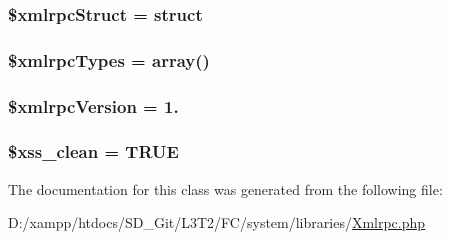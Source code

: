 \subsubsection[{\$xmlrpc\+Struct}]{\setlength{\rightskip}{0pt plus 5cm}\$xmlrpc\+Struct = \textquotesingle{}struct\textquotesingle{}}\label{class_c_i___xmlrpc_a9a499285050ed5c867eec71854231f01}
\hypertarget{class_c_i___xmlrpc_a2b937e1ca5ee8495f0251a74222cec64}{}
\subsubsection[{\$xmlrpc\+Types}]{\setlength{\rightskip}{0pt plus 5cm}\$xmlrpc\+Types = array()}\label{class_c_i___xmlrpc_a2b937e1ca5ee8495f0251a74222cec64}
\hypertarget{class_c_i___xmlrpc_a4130f55bb1f23dcabf9cf3ae5f5a746d}{}
\subsubsection[{\$xmlrpc\+Version}]{\setlength{\rightskip}{0pt plus 5cm}\$xmlrpc\+Version = \textquotesingle{}1.\textquotesingle{}}\label{class_c_i___xmlrpc_a4130f55bb1f23dcabf9cf3ae5f5a746d}
\hypertarget{class_c_i___xmlrpc_a0f2ee8861c0b3164a5c6e126dd98c0cc}{}
\subsubsection[{\$xss\+\_\+clean}]{\setlength{\rightskip}{0pt plus 5cm}\$xss\+\_\+clean = T\+R\+U\+E}\label{class_c_i___xmlrpc_a0f2ee8861c0b3164a5c6e126dd98c0cc}


The documentation for this class was generated from the following file\+:\begin{DoxyCompactItemize}
\item 
D\+:/xampp/htdocs/\+S\+D\+\_\+\+Git/\+L3\+T2/\+F\+C/system/libraries/\hyperlink{_xmlrpc_8php}{Xmlrpc.\+php}\end{DoxyCompactItemize}
